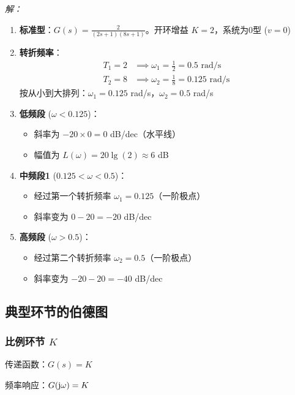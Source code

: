 \textit{解：}
\begin{enumerate}
    \item \textbf{标准型}：$G(s) = \frac{2}{(2s+1)(8s+1)}$。开环增益 $K=2$，系统为0型 ($v=0$)
    
    \item \textbf{转折频率}：
    \begin{align*}
    T_1=2 &\implies \omega_1=\frac{1}{2}=0.5 \text{ rad/s} \\
    T_2=8 &\implies \omega_2=\frac{1}{8}=0.125 \text{ rad/s}
    \end{align*}
    按从小到大排列：$\omega_1 = 0.125$ rad/s，$\omega_2 = 0.5$ rad/s
    
    \item \textbf{低频段} ($\omega < 0.125$)：
    \begin{itemize}
        \item 斜率为 $-20 \times 0 = 0$ dB/dec（水平线）
        \item 幅值为 $L(\omega) = 20\lg(2) \approx 6$ dB
    \end{itemize}
    
    \item \textbf{中频段1} ($0.125 < \omega < 0.5$)：
    \begin{itemize}
        \item 经过第一个转折频率 $\omega_1 = 0.125$（一阶极点）
        \item 斜率变为 $0 - 20 = -20$ dB/dec
    \end{itemize}
    
    \item \textbf{高频段} ($\omega > 0.5$)：
    \begin{itemize}
        \item 经过第二个转折频率 $\omega_2 = 0.5$（一阶极点）
        \item 斜率变为 $-20 - 20 = -40$ dB/dec
    \end{itemize}
\end{enumerate}

\subsection{典型环节的伯德图}

\subsubsection{比例环节 \texorpdfstring{$K$}{K}}
传递函数：$G(s) = K$

频率响应：$G(\mathrm{j}\omega) = K$

